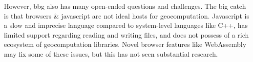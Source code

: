 However, \ac{bbg} also has many open-ended questions and challenges. 
The big catch is that browsers \& javascript are not ideal hosts for geocomputation. 
Javascript is a slow and imprecise language compared to system-level languages like C++, has limited support regarding reading and writing files, and does not possess of a rich ecosystem of geocomputation libraries.  
Novel browser features like WebAssembly may fix some of these issues, but this has not seen substantial research. 






